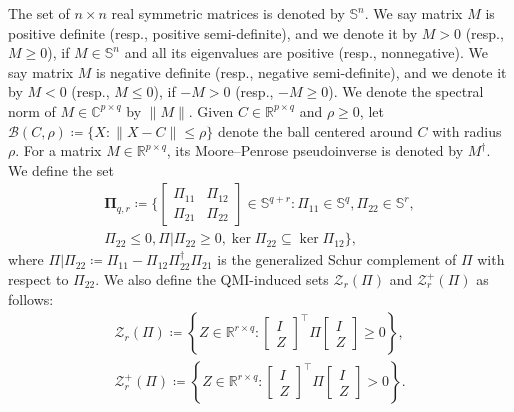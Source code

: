 \documentclass[9pt,shortpaper,twoside,web]{ieeecolor}
\begin{document}
The set of $n\times n$ real symmetric matrices is denoted by $\mathbb{S}^n$. We say matrix $M$ is positive definite (resp., positive semi-definite), and we denote it by $M>0$ (resp., $M\geq 0$), if $M\in\mathbb{S}^{n}$ and all its eigenvalues are positive (resp., nonnegative). We say matrix $M$ is negative definite (resp., negative semi-definite), and we denote it by $M<0$ (resp., $M\leq 0$), if $-M>0$ (resp., \mbox{$-M\geq 0$}). We denote the spectral norm of $M \in \mathbb{C}^{p \times q}$ by $\|M\|$. Given \mbox{$C\in\mathbb{R}^{p\times q}$} and $\rho\geq 0$, let $\mathcal{B}(C,\rho)\coloneqq\{X:\|X-C\|\leq\rho\}$ denote the ball centered around $C$ with radius $\rho$. For a matrix $M\in\mathbb{R}^{p\times q}$, its Moore–Penrose pseudoinverse is denoted by $M^\dagger$. We define the set 
\begin{equation}
\begin{split}
\pmb{\Pi}_{q,r}\coloneqq \bigg\{\begin{bmatrix}
\Pi_{11} & \Pi_{12} \\
\Pi_{21} & \Pi_{22}
\end{bmatrix}\in\mathbb{S}^{q+r}: \Pi_{11}\in\mathbb{S}^q,\Pi_{22}\in\mathbb{S}^r,\\
\Pi_{22}\leq 0,\Pi|\Pi_{22}\geq 0,\ker\Pi_{22}\subseteq\ker\Pi_{12}\bigg\},
\end{split}
\end{equation}
where $\Pi|\Pi_{22}\coloneqq \Pi_{11}-\Pi_{12} \Pi_{22}^{\dagger} \Pi_{21}$ is the generalized Schur complement of $\Pi$ with respect to $\Pi_{22}$. We also define the QMI-induced sets $\mathcal{Z}_r(\Pi)$ and $\mathcal{Z}^+_r(\Pi)$ as follows:
\begin{equation}
\label{eq:Zp}
\begin{split}
\mathcal{Z}_r(\Pi)\coloneqq \left\{Z\in\mathbb{R}^{r\times q}:\begin{bmatrix}
I \\ Z
\end{bmatrix}^\top \Pi \begin{bmatrix}
I \\ Z
\end{bmatrix}\geq 0\right\},  \\
\mathcal{Z}^+_r(\Pi)\coloneqq \left\{Z\in\mathbb{R}^{r\times q}:\begin{bmatrix}
I \\ Z
\end{bmatrix}^\top \Pi \begin{bmatrix}
I \\ Z
\end{bmatrix} > 0\right\}.
\end{split}
\end{equation}
\end{document}

